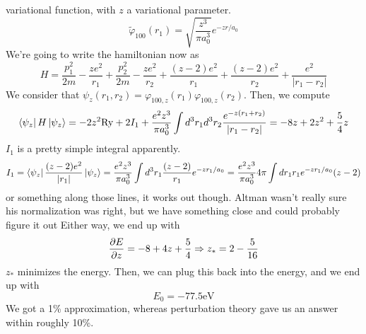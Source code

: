\documentclass{article}
\theoremstyle{definition}
\begin{document}
variational function, with $z$ a variational parameter. \begin{equation} \tilde\varphi_{100}(r_1)=\sqrt{\frac{z^3}{\pi a_0^3}}e^{-zr/a_0} \end{equation} We're going to write the hamiltonian now as \begin{equation} H=\frac{p_1^2}{2m}-\frac{ze^2}{r_1}+\frac{p_2^2}{2m}-\frac{ze^2}{r_2}+\frac{(z-2)e^2}{r_1}+\frac{(z-2)e^2}{r_2}+\frac{e^2}{|r_1-r_2|} \end{equation} We consider that $\psi_z(r_1,r_2)=\varphi_{100,z}(r_1)\varphi_{100,z}(r_2)$. Then, we compute \begin{align} \bra{\psi_z}H\ket{\psi_z}=-2z^2\mathrm{Ry}+2I_1+\frac{e^2z^3}{\pi a_0^3}\int d^3r_1d^3r_2\frac{e^{-z(r_1+r_2)}}{|r_1-r_2|}=-8z+2z^2+\frac{5}{4}z \end{align} $I_1$ is a pretty simple integral apparently. \begin{equation} I_1=\bra{\psi_z}\frac{(z-2)e^2}{|r_1|}\ket{\psi_z}=\frac{e^2z^3}{\pi a_0^3}\int d^3r_1\frac{(z-2)}{r_1}e^{-zr_1/a_0}=\frac{e^2z^3}{\pi a_0^3}4\pi\int dr_1r_1e^{-zr_1/a_0}(z-2) \end{equation} or something along those lines, it works out though. Altman wasn't really sure his normalization was right, but we have something close and could probably figure it out Either way, we end up with \begin{equation} \pdv{E}{z}=-8+4z+\frac{5}{4}\Rightarrow z_*=2-\frac{5}{16} \end{equation} $z_*$ minimizes the energy. Then, we can plug this back into the energy, and we end up with \begin{equation} E_0=-77.5\mathrm{eV} \end{equation} We got a 1\% approximation, whereas perturbation theory gave us an answer within roughly 10\%.
\end{document}
